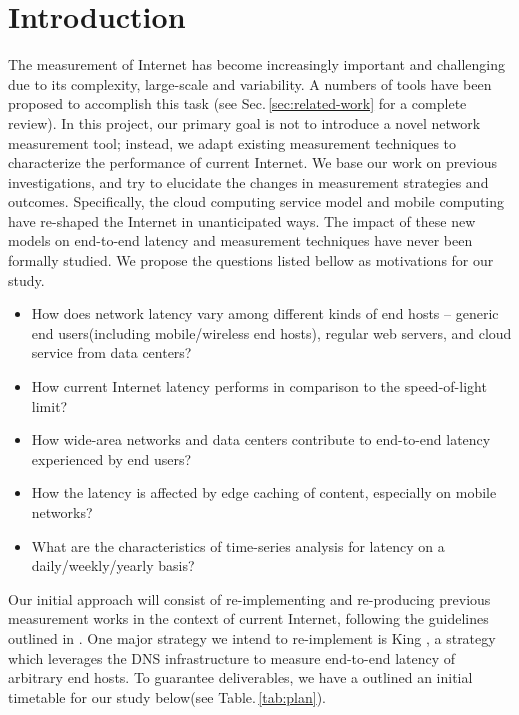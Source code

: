 \section{Introduction}
\label{sec:introduction}

The measurement of Internet has become increasingly important and challenging due to its complexity, large-scale and variability. A numbers of tools have been proposed to accomplish this task (see Sec.\,\ref{sec:related-work} for a complete review). In this project, our primary goal is not to introduce a novel network measurement tool; instead, we adapt existing measurement techniques to characterize the performance of current Internet. We base our work on previous investigations, and try to elucidate the changes in measurement strategies and outcomes. Specifically, the cloud computing service model and mobile computing have re-shaped the Internet in unanticipated ways. The impact of these new models on end-to-end latency and measurement techniques have never been formally studied. We propose the questions listed bellow as motivations for our study.

\begin{itemize}
\item How does network latency vary among different kinds of end hosts -- generic end users(including mobile/wireless end hosts), regular web servers, and cloud service from data centers?
\item How current Internet latency performs in comparison to the speed-of-light limit?
\item How wide-area networks and data centers contribute to end-to-end latency experienced by end users?
\item How the latency is affected by edge caching of content, especially on mobile networks?
\item What are the characteristics of time-series analysis for latency on a daily/weekly/yearly basis?
\end{itemize}

Our initial approach will consist of re-implementing and re-producing previous measurement works in the context of current Internet, following the guidelines outlined in \cite{paxson2004strategies}. One major strategy we intend to re-implement is King \cite{gummadi2002king}, a strategy which leverages the DNS infrastructure to measure end-to-end latency of arbitrary end hosts. To guarantee deliverables, we have a outlined an initial timetable for our study below(see Table.\,\ref{tab:plan}).

